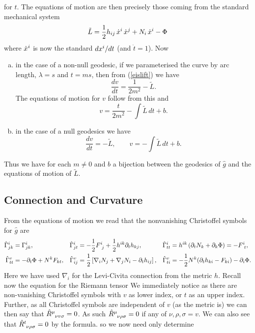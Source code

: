 \documentclass{article}
\begin{document}
for $t$. The equations of motion are then precisely those coming from the standard mechanical system
$$\tilde L= \frac12 h_{ij}\, \dot x\sp{i}\, \dot x\sp{j}+N_i \,\dot x\sp{i}-\Phi $$
where $ \dot x\sp{i}$ is now the standard $d x\sp{i}/dt$ (and $\dot t = 1$). Now
\begin{enumerate}[(a)]
	\item in the case of a non-null geodesic, if we parameterised the curve by arc length, $\lambda=s$ and $t =ms$, then from (\ref{eislift}) we have 
	$$\frac{dv}{dt}= \frac1{2m^2} -\tilde L.$$
	The equations of motion for $v$ follow from this and
	$$v=\frac{t}{2m^2}-\int \tilde L\, dt +b.$$
	\item in the case of a null geodesics we have
	$$\frac{dv}{dt}=  -\tilde L,\qquad  v=-\int \tilde L\, dt +b.$$
\end{enumerate}
Thus we have for each $m\ne0$ and $b$ a bijection between the geodesics of $\hat g$ and the
equations of motion of $\tilde L$.
\subsection{Connection and Curvature}
From the equations of motion we read that the nonvanishing Christoffel symbols for $\hat g$ are
\begin{align*}
\hat \Gamma\sp{i}_{jk}&=  \Gamma\sp{i}_{jk},
&\hat \Gamma\sp{i}_{jt}&=-\frac12 F\sp{i}_{\ j}+\frac12 h\sp{ik}\partial_t h_{kj},
&\hat \Gamma\sp{i}_{tt}&=h\sp{ik} \left( \partial_t N_k +\partial_{k} \Phi \right)= -F\sp{i}_{\ t},
\\
\hat \Gamma\sp{v}_{tt}&=-\partial_t \Phi+N\sp{k}F_{kt}, 
&\hat \Gamma\sp{v}_{ij}&=\frac12\left[\nabla_{i}N_{j}+\nabla_{j}N_{i}-\partial_t h_{ij}\right],
&\hat \Gamma\sp{v}_{ti}&=-\frac12 N\sp{k} (\partial_t h_{ki} -F_{ki}) -\partial_i\Phi .
\end{align*}
Here we have used $\nabla_i$ for the Levi-Civita connection from the metric $h$. Recall now the equation for the Riemann tensor 
We immediately notice 
as there are non-vanishing Christoffel symbols with $v$ as lower index, or $t$ as an upper index. \\
Further, as all Christoffel symbols are independent of $v$ (as the metric is) we can then say that $\hat{R}\indices{^\mu_\nu_v_\sigma} = 0$. As such $\hat{R}\indices{^\mu_\nu_\rho_\sigma}=0$ if any of $\nu,\rho,\sigma=v$. We can also see that $\hat{R}\indices{^t_\nu_\rho_\sigma}=0$ by the formula. so we now need only determine
\end{document}
